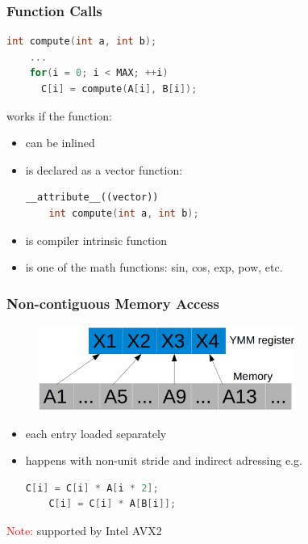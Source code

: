 \documentclass{beamer}
\begin{document}
\begin{frame}[fragile]
  \frametitle{Function Calls}
     
     \begin{lstlisting}[language=C++]
	int compute(int a, int b);
	...
	for(i = 0; i < MAX; ++i) 
	  C[i] = compute(A[i], B[i]);   
     \end{lstlisting}
    
    works if the function:
    \begin{itemize}
     \item can be inlined
     \item is declared as a vector function:
     \begin{lstlisting}[language=C++]
	__attribute__((vector))
	int compute(int a, int b);
     \end{lstlisting}

     \item is compiler intrinsic function
     \item is one of the math functions: sin, cos, exp, pow, etc.
    \end{itemize}    
\end{frame}

\begin{frame}[fragile]
  \frametitle{Non-contiguous Memory Access}
  \begin{figure}
    \begin{center}
      \includegraphics[width=0.75\textwidth]{non-contigous}
    \end{center}
  \end{figure}
  
  \begin{itemize}
   \item each entry loaded separately
   \item happens with non-unit stride and indirect adressing e.g.
   \begin{lstlisting}[language=C++]
    C[i] = C[i] * A[i * 2];
    C[i] = C[i] * A[B[i]];
   \end{lstlisting}
  \end{itemize}
  
  \textcolor{red}{Note:} supported by Intel AVX2 
\end{frame}
\end{document}
